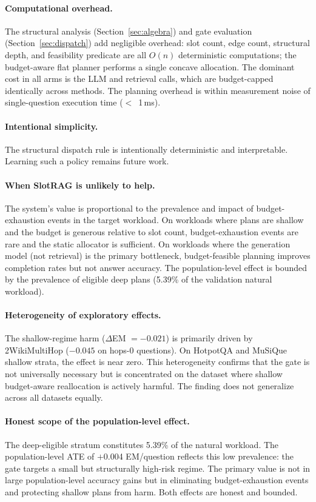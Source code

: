 \paragraph{Computational overhead.}
The structural analysis (Section~\ref{sec:algebra}) and gate evaluation (Section~\ref{sec:dispatch}) add negligible overhead: slot count, edge count, structural depth, and feasibility predicate are all $O(n)$ deterministic computations; the budget-aware flat planner performs a single concave allocation. The dominant cost in all arms is the LLM and retrieval calls, which are budget-capped identically across methods. The planning overhead is within measurement noise of single-question execution time ($<$~1\,ms).

\paragraph{Intentional simplicity.}
The structural dispatch rule is intentionally deterministic and interpretable. Learning such a policy remains future work.

\paragraph{When SlotRAG is unlikely to help.}
The system's value is proportional to the prevalence and impact of budget-exhaustion events in the target workload. On workloads where plans are shallow and the budget is generous relative to slot count, budget-exhaustion events are rare and the static allocator is sufficient. On workloads where the generation model (not retrieval) is the primary bottleneck, budget-feasible planning improves completion rates but not answer accuracy. The population-level effect is bounded by the prevalence of eligible deep plans (5.39\% of the validation natural workload).

\paragraph{Heterogeneity of exploratory effects.}
The shallow-regime harm ($\Delta$EM $= -0.021$) is primarily driven by 2WikiMultiHop ($-0.045$ on hops-0 questions). On HotpotQA and MuSiQue shallow strata, the effect is near zero. This heterogeneity confirms that the gate is not universally necessary but is concentrated on the dataset where shallow budget-aware reallocation is actively harmful. The finding does not generalize across all datasets equally.

\paragraph{Honest scope of the population-level effect.}
The deep-eligible stratum constitutes 5.39\% of the natural workload. The population-level ATE of $+$0.004 EM/question reflects this low prevalence: the gate targets a small but structurally high-risk regime. The primary value is not in large population-level accuracy gains but in eliminating budget-exhaustion events and protecting shallow plans from harm. Both effects are honest and bounded.
